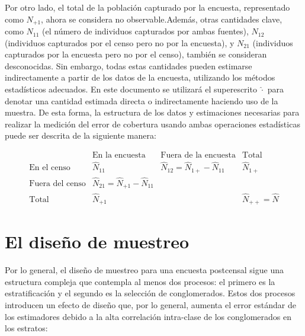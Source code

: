\documentclass[
  12pt,
]{book}
\begin{document}
Por otro lado, el total de la población capturado por la encuesta, representado como \(N_{+1}\), ahora se considera no observable.Además, otras cantidades clave, como \(N_{11}\) (el número de individuos capturados por ambas fuentes), \(N_{12}\) (individuos capturados por el censo pero no por la encuesta), y \(N_{21}\) (individuos capturados por la encuesta pero no por el censo), también se consideran desconocidas. Sin embargo, todas estas cantidades pueden estimarse indirectamente a partir de los datos de la encuesta, utilizando los métodos estadísticos adecuados. En este documento se utilizará el superescrito \(\hat \cdot\) para denotar una cantidad estimada directa o indirectamente haciendo uso de la muestra. De esta forma, la estructura de los datos y estimaciones necesarias para realizar la medición del error de cobertura usando ambas operaciones estadísticas puede ser descrita de la siguiente manera:

\[
    \begin{array}{c|cc|c}
    & \text{En la encuesta} & \text{Fuera de la encuesta} & \text{Total} \\
    \hline
    \text{En el censo} & \hat{N}_{11} & \hat{N}_{12} = \hat{N}_{1+} - \hat{N}_{11} & \hat{N}_{1+} \\
    \text{Fuera del censo} & \hat{N}_{21} = \hat{N}_{+1} - \hat{N}_{11} &  &  \\
    \hline
    \text{Total} & \hat{N}_{+1} &  & \hat{N}_{++} = \hat{N}
    \end{array}
    \]

\hypertarget{el-diseuxf1o-de-muestreo}{%
\section{El diseño de muestreo}\label{el-diseuxf1o-de-muestreo}}

Por lo general, el diseño de muestreo para una encuesta postcensal sigue una estructura compleja que contempla al menos dos procesos: el primero es la estratificación y el segundo es la selección de conglomerados. Estos dos procesos introducen un efecto de diseño que, por lo general, aumenta el error estándar de los estimadores debido a la alta correlación intra-clase de los conglomerados en los estratos:
\end{document}
